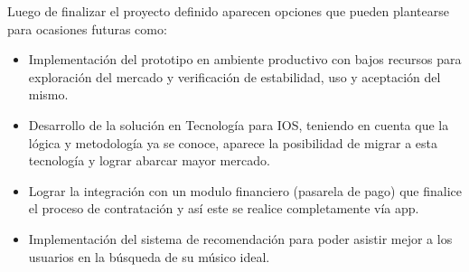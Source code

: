 Luego de finalizar el proyecto definido aparecen opciones que pueden plantearse para ocasiones futuras como:
\begin{itemize}
\item Implementación del prototipo en ambiente productivo con bajos recursos para exploración del mercado y verificación de estabilidad, uso y aceptación del mismo.
\item Desarrollo de la solución en Tecnología para IOS, teniendo en cuenta que la lógica y metodología ya se conoce, aparece la posibilidad de migrar a esta tecnología y lograr abarcar mayor mercado.
\item Lograr la integración con un modulo financiero (pasarela de pago) que finalice el proceso de contratación y así este se realice completamente vía app.
\item Implementación del sistema de recomendación para poder asistir mejor a los usuarios en la búsqueda de su músico ideal.
\end{itemize}
